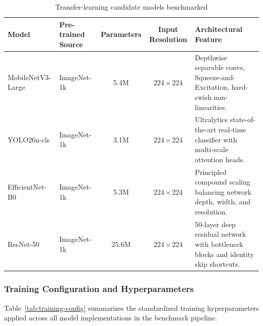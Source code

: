 \documentclass[11pt,a4paper]{article}
\begin{document}
\begin{table}[H]
\centering\small
\begin{tabular}{|l|l|c|c|p{}|}
\hline
\textbf{Model} & \textbf{Pre-trained Source} & \textbf{Parameters} & \textbf{Input Resolution} & \textbf{Architectural Feature} \\
\hline
MobileNetV3-Large & ImageNet-1k & 5.4M & $224 \times 224$ & Depthwise separable convs, Squeeze-and-Excitation, hard-swish non-linearities. \\ \hline
YOLO26n-cls & ImageNet-1k & 3.1M & $224 \times 224$ & Ultralytics state-of-the-art real-time classifier with multi-scale attention heads. \\ \hline
EfficientNet-B0 & ImageNet-1k & 5.3M & $224 \times 224$ & Principled compound scaling balancing network depth, width, and resolution. \\ \hline
ResNet-50 & ImageNet-1k & 25.6M & $224 \times 224$ & 50-layer deep residual network with bottleneck blocks and identity skip shortcuts. \\ \hline
\end{tabular}
\caption{Transfer-learning candidate models benchmarked}
\label{tab:transfer-models}
\end{table}

\subsubsection{Training Configuration and Hyperparameters}
Table~\ref{tab:training-config} summarizes the standardized training hyperparameters applied across all model implementations in the benchmark pipeline.
\end{document}
